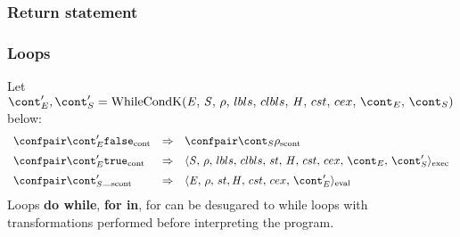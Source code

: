 \documentclass{article}
\begin{document}
\subsubsection{Return statement}

\subsubsection{Loops}
Let $\econt', \scont' = \whilecondk$ below:
\[
  \begin{array}{lcl}
	\contconf{\econt'}{\false}
	& \Rightarrow &
	\scontconf{\scont}{\env}\\[2mm]

	\contconf{\econt'}{\true}
	& \Rightarrow &
	\execconf{\stmt}{\env}{\lbls}{\clbls}{\handler}{\cstrace}{\cex}{\econt}{\scont'}\\[2mm]

	\scontconf{\scont'}{\_}
	& \Rightarrow &
	\evalconf{\expr}{\env}{\strace}{\cstrace}{\cex}{\econt'}\\
  \end{array}
\]
Loops \textbf{do while}, \textbf{for in}, for can be desugared to while loops with transformations performed before interpreting the program.
\end{document}
